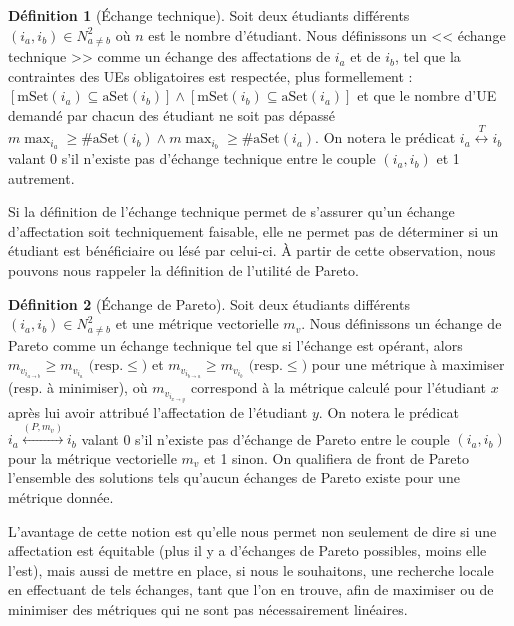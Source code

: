\documentclass{rapport}
\theoremstyle{definition}
\newtheorem{definition}{Définition}
\theoremstyle{remark}
\theoremstyle{plain}
\theoremstyle{definition}
\theoremstyle{definition}
\theoremstyle{remark}
\theoremstyle{definition}
\begin{document}
\begin{definition}[Échange technique]
    Soit deux étudiants différents $\left(i_a,i_b\right)\in N^2_{a\ne b}$ où $n$ est le nombre d'étudiant.
    Nous définissons un << échange technique >> comme un échange des affectations de $i_a$ et de $i_b$, tel que la contraintes des UEs obligatoires est respectée, plus formellement : $\left[\text{mSet}(i_a)\subseteq\text{aSet}(i_b)\right] \land \left[\text{mSet}(i_b)\subseteq\text{aSet}(i_a)\right]$
    et que le nombre d'UE demandé par chacun des étudiant ne soit pas dépassé $m\!\max_{i_a}\ge\#\text{aSet}(i_b)\land m\!\max_{i_b}\ge\#\text{aSet}(i_a)$.
    On notera le prédicat $i_a\stackrel{T}{\longleftrightarrow} i_b$ valant 0 s'il n'existe pas d'échange technique entre le couple $(i_a, i_b)$ et 1 autrement.
\end{definition}

Si la définition de l'échange technique permet de s'assurer qu'un échange d'affectation soit techniquement faisable, elle ne permet pas de déterminer si un étudiant est bénéficiaire ou lésé par celui-ci.
À partir de cette observation, nous pouvons nous rappeler la définition de l'utilité de Pareto.
\begin{definition}[Échange de Pareto]
    Soit deux étudiants différents $\left(i_a,i_b\right)\in N^2_{a\ne b}$ et une métrique vectorielle $m_v$.
    Nous définissons un échange de Pareto comme un échange technique tel que si l'échange est opérant, alors $m_{v_{i_{a\to b}}} \ge m_{v_{i_a}}\text{ (resp.}\le\text{)}$ et $m_{v_{i_{b\to a}}} \ge m_{v_{i_b}}\text{ (resp.}\le\text{)}$ pour une métrique à maximiser (resp. à minimiser),
    où $m_{v_{i_{x\to y}}}$ correspond à la métrique calculé pour l'étudiant $x$ après lui avoir attribué l'affectation de l'étudiant $y$.
    On notera le prédicat $i_a\stackrel{(P,m_v)}{\longleftrightarrow} i_b$ valant 0 s'il n'existe pas d'échange de Pareto entre le couple $(i_a, i_b)$ pour la métrique vectorielle $m_v$ et 1 sinon.
    On qualifiera de front de Pareto l'ensemble des solutions tels qu'aucun échanges de Pareto existe pour une métrique donnée.
\end{definition}

L'avantage de cette notion est qu'elle nous permet non seulement de dire si une affectation est équitable (plus il y a d'échanges de Pareto possibles, moins elle l'est), mais aussi de mettre en place, si nous le souhaitons, une recherche locale en effectuant de tels échanges, tant que l'on en trouve, afin de maximiser ou de minimiser des métriques qui ne sont pas nécessairement linéaires.
\end{document}
